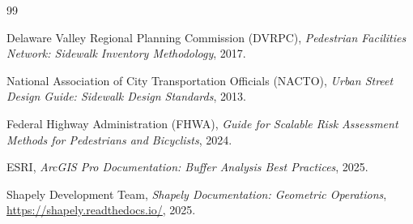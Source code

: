 \documentclass[11pt,letterpaper]{article}
\begin{document}

\begin{thebibliography}{99}

Delaware Valley Regional Planning Commission (DVRPC),
\textit{Pedestrian Facilities Network: Sidewalk Inventory Methodology},
2017.

National Association of City Transportation Officials (NACTO),
\textit{Urban Street Design Guide: Sidewalk Design Standards},
2013.

Federal Highway Administration (FHWA),
\textit{Guide for Scalable Risk Assessment Methods for Pedestrians and Bicyclists},
2024.

ESRI,
\textit{ArcGIS Pro Documentation: Buffer Analysis Best Practices},
2025.

Shapely Development Team,
\textit{Shapely Documentation: Geometric Operations},
\url{https://shapely.readthedocs.io/},
2025.

\end{thebibliography}
\end{document}
